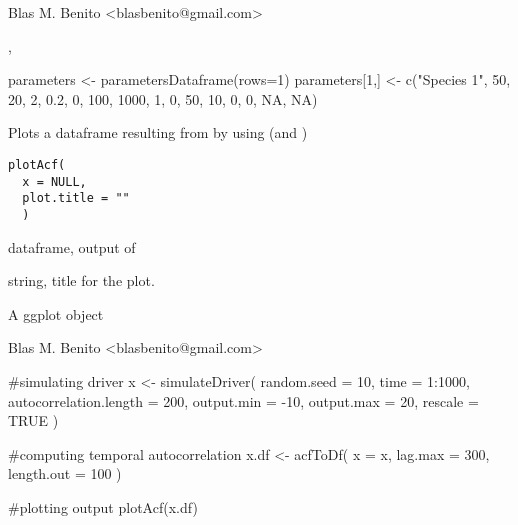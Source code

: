 \documentclass[letterpaper]{book}
\begin{document}
%
\begin{Author}\relax
Blas M. Benito  <blasbenito@gmail.com>
\end{Author}
%
\begin{SeeAlso}\relax
{}, 
\end{SeeAlso}
%
\begin{Examples}
\begin{ExampleCode}

parameters <- parametersDataframe(rows=1)
parameters[1,] <- c("Species 1", 50, 20, 2, 0.2, 0, 100, 1000, 1, 0, 50, 10, 0, 0, NA, NA)

\end{ExampleCode}
\end{Examples}
%
\begin{Description}\relax
Plots a dataframe resulting from  by using  (and )
\end{Description}
%
\begin{Usage}
\begin{verbatim}
plotAcf(
  x = NULL,
  plot.title = ""
  )
\end{verbatim}
\end{Usage}
%
\begin{Arguments}
\begin{ldescription}
\item[\code{x}] dataframe, output of 

\item[\code{plot.title}] string, title for the plot.
\end{ldescription}
\end{Arguments}
%
\begin{Value}
A ggplot object
\end{Value}
%
\begin{Author}\relax
Blas M. Benito  <blasbenito@gmail.com>
\end{Author}
%
\begin{SeeAlso}\relax
{}
\end{SeeAlso}
%
\begin{Examples}
\begin{ExampleCode}

#simulating driver
x <- simulateDriver(
  random.seed = 10,
  time = 1:1000,
  autocorrelation.length = 200,
  output.min = -10,
  output.max = 20,
  rescale = TRUE
  )

#computing temporal autocorrelation
x.df <- acfToDf(
  x = x,
  lag.max = 300,
  length.out = 100
  )

#plotting output
plotAcf(x.df)

\end{ExampleCode}
\end{Examples}
\end{document}
